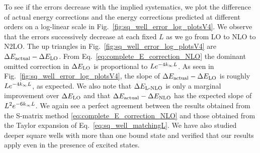 	To see if the errors decrease with the implied systematics, we plot
	the difference of actual energy corrections and the energy corrections
	predicted at different orders on a log-linear scale in
	Fig.~\ref{fig:sq_well_error_log_plotsV4}.  We observe that the errors
	successively decrease at each fixed $L$ as we go from LO to NLO to
	N2LO.  The up triangles in Fig.~\ref{fig:sq_well_error_log_plotsV4} are
	$\Delta E_{\rm actual} - \Delta E_{\rm LO}$.  From
	Eq.~\eqref{eq:complete_E_correction_NLO} the dominant omitted
	correction in $\Delta E_{\rm LO}$ is proportional to $L e^{-4 k_{\infty} L}$.
	As seen in Fig.~\ref{fig:sq_well_error_log_plotsV4}, the slope
	of $\Delta E_{\rm actual} - \Delta E_{\rm LO}$ is roughly $L
	e^{-4 k_{\infty} L}$, as expected.  We also note that $\Delta E_{\rm \text{L-NLO}}$
	is only a marginal improvement over $\Delta E_{\rm LO}$ and that
	$\Delta E_{\rm actual} - \Delta E_{\rm NLO}$ has the expected slope of
	$L^2 e^{-6 k_{\infty} L}$. We again see a perfect agreement between the
	results obtained from the S-matrix method
	\eqref{eq:complete_E_correction_NLO} and those obtained from the
	Taylor expansion of Eq.~\eqref{eq:sq_well_matchingL}.  We have also
	studied deeper square wells with more than one bound state
	and verified that our results apply even in the presence of excited
	states.

